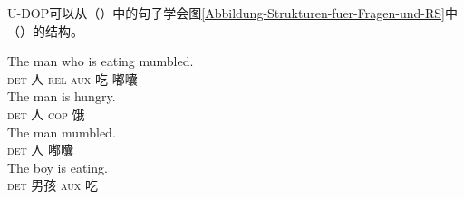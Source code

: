 \eal
{}
\zl

\noindent
U-DOP可以从（）中的句子学会图\vref{Abbildung-Strukturen-fuer-Fragen-und-RS}中（）的结构。

\eal
\label{Hilfsverbinversion-Input}
\ex\label{Bsp-The-man-who-is-eatin-mumbled}
\gll The man who is eating mumbled.\\
\textsc{det} 人 \textsc{rel} \textsc{aux} 吃 嘟囔\\
\ex \gll The man is hungry.\\
\textsc{det} 人 \textsc{cop}  饿\\
\ex \gll The man mumbled.\\
\textsc{det} 人 嘟囔\\
\ex \gll The boy is eating.\\
\textsc{det} 男孩 \textsc{aux} 吃\\
\zl

